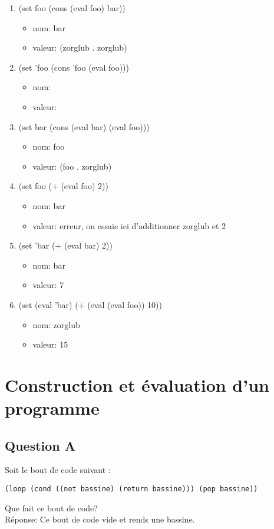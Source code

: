 \documentclass[a4paper, 11pt]{article}
\begin{document}
\begin{enumerate}
\item (set foo (cons (eval foo) bar))
  \begin{itemize}
  \item nom: bar
  \item valeur: (zorglub . zorglub)
  \end{itemize}
\item (set 'foo (cons 'foo (eval foo)))
  \begin{itemize}
  \item nom:
  \item valeur:
  \end{itemize}
\item (set bar (cons (eval bar) (eval foo)))
  \begin{itemize}
  \item nom: foo
  \item valeur: (foo . zorglub)
  \end{itemize}
\item (set foo (+ (eval foo) 2))
  \begin{itemize}
  \item nom: bar
  \item valeur: erreur, on essaie ici d'additionner zorglub et 2
  \end{itemize}
\item (set 'bar (+ (eval bar) 2))
  \begin{itemize}
  \item nom: bar
  \item valeur: 7
  \end{itemize}
\item (set (eval 'bar) (+ (eval (eval foo)) 10))
  \begin{itemize}
  \item nom: zorglub
  \item valeur: 15
  \end{itemize}
\end{enumerate}

\section{Construction et évaluation d'un programme}
\subsection{Question A}
Soit le bout de code suivant :
\begin{lstlisting}
(loop (cond ((not bassine) (return bassine))) (pop bassine))
\end{lstlisting}
Que fait ce bout de code?\\
Réponse: Ce bout de code vide et rends une bassine.
\end{document}

